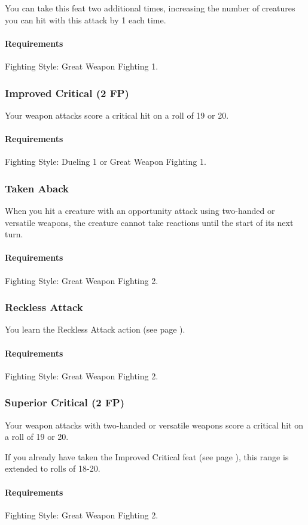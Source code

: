     You can take this feat two additional times, increasing the number of creatures you can hit with this attack by 1 each time.
    \paragraph{Requirements} Fighting Style: Great Weapon Fighting 1.
\subsubsection{Improved Critical (2 FP)} \label{feat::improvedcritical}
    Your weapon attacks score a critical hit on a roll of 19 or 20.
    \paragraph{Requirements} Fighting Style: Dueling 1 or Great Weapon Fighting 1.
\subsubsection{Taken Aback} \label{feat::takenaback}
    When you hit a creature with an opportunity attack using two-handed or versatile weapons, the creature cannot take reactions until the start of its next turn.
    \paragraph{Requirements} Fighting Style: Great Weapon Fighting 2.
\subsubsection{Reckless Attack} \label{feat::recklessattack}
    You learn the Reckless Attack action (see page \pageref{act::recklessattack}).
    \paragraph{Requirements} Fighting Style: Great Weapon Fighting 2.
\subsubsection{Superior Critical (2 FP)} \label{feat::superiorcritical}
    Your weapon attacks with two-handed or versatile weapons score a critical hit on a roll of 19 or 20.

    If you already have taken the Improved Critical feat (see page \pageref{feat::improvedcritical}), this range is extended to rolls of 18-20.
    \paragraph{Requirements} Fighting Style: Great Weapon Fighting 2.
